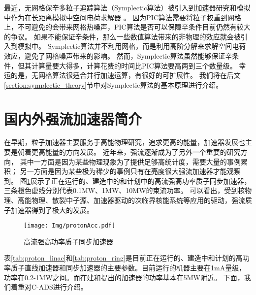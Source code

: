 最近，无网格保辛多粒子追踪算法（Symplectic算法）被引入到加速器研究和模拟中作为在长距离模拟中空间电荷求解器 \cite{symplectic_ji2017}。
因为PIC算法需要将粒子权重到网格上，不可避免的会带来网格热噪声，PIC算法是否可以保障辛条件目前仍然有较大的争议。
如果不能保证辛条件，那么一些数值算法带来的非物理的效应就会被引入到模拟中。
Symplectic算法并不利用网格，而是利用高阶分解来求解空间电荷效应，避免了网格噪声带来的影响。
然而，Symplectic算法虽然能够保证辛条件，但其计算量要大得多，计算花费的时间比PIC算法要高两到三个数量级。
幸运的是，无网格算法很适合并行加速运算，有很好的可扩展性。
我们将在后文\ref{section:symplectic_theory}节中对Symplectic算法的基本原理进行介绍。

\section{国内外强流加速器简介}

在早期，粒子加速器主要服务于高能物理研究，追求更高的能量，加速器发展也主要是朝着更高能量的方向发展。
近年来，强流逐渐成为了另外一个重要的研究方向，
其中一方面是因为某些物理现象为了提供足够高统计度，需要大量的事例累积；
另一方面是因为某些极为稀少的事例只有在亮度很大强流加速器才能观察到。
图\ref{fig:proton_ring}展示了正在运行的、建造中的和计划中的高流强高功率质子同步加速器，三条橙色虚线分别代表0.1MW、1MW、10MW的束流功率。
可以看出，受到核物理、高能物理、散裂中子源、加速器驱动的次临界核能系统等应用的驱动，强流质子加速器得到了极大的发展。
\begin{figure}[!htb]
    \centering
    \texttt{[image: Img/protonAcc.pdf]}
    \caption{高流强高功率质子同步加速器}
    \label{fig:proton_ring}
\end{figure}

表\ref{tab:proton_linac}和\ref{tab:proton_ring}是目前正在运行的、建造中和计划的高功率质子直线加速器和同步加速器的主要参数\cite{tang2011proton}。目前运行的机器主要在1mA量级，功率在0.2-1MW之间。而在建和提出的加速器的功率基本在5MW附近。
下面，我们着重对C-ADS进行介绍。


